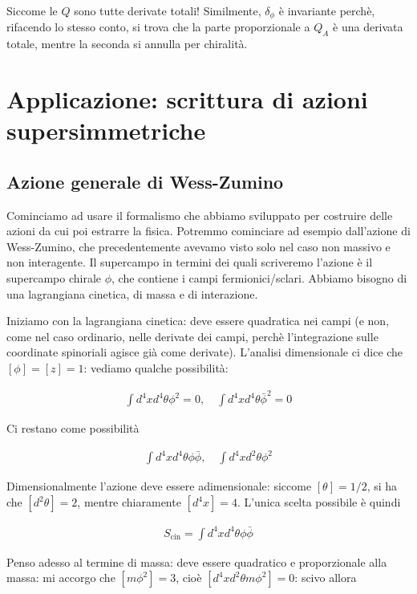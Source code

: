 \documentclass{report}
\begin{document}
Siccome le \(Q\) sono tutte derivate totali! Similmente, \(\delta_\phi\) è invariante perchè, rifacendo lo stesso conto, si trova che la parte proporzionale a \(Q_A\) è una derivata totale, mentre la seconda si annulla per chiralità. 

\section{Applicazione: scrittura di azioni supersimmetriche}

\subsection{Azione generale di Wess-Zumino}

Cominciamo ad usare il formalismo che abbiamo sviluppato per costruire delle azioni da cui poi estrarre la fisica. Potremmo cominciare ad esempio dall'azione di Wess-Zumino, che precedentemente avevamo visto solo nel caso non massivo e non interagente. Il supercampo in termini dei quali scriveremo l'azione è il supercampo chirale \(\phi\), che contiene i campi fermionici/sclari. Abbiamo bisogno di una lagrangiana cinetica, di massa e di interazione. 

Iniziamo con la lagrangiana cinetica: deve essere quadratica nei campi (e non, come nel caso ordinario, nelle derivate dei campi, perchè l'integrazione sulle coordinate spinoriali agisce già come derivate). L'analisi dimensionale ci dice che \([\phi] = [z] = 1\): vediamo qualche possibilità: 

\begin{align}
    \int d^4x d^4 \theta \phi^2 = 0, \quad \int d^4x d^4\theta \bar{\phi}^2 = 0 
\end{align}

Ci restano come possibilità 

\begin{align}
    \int d^4x d^4 \theta \phi \bar{\phi}, \quad \int d^4x d^2\theta \phi^2
\end{align}

Dimensionalmente l'azione deve essere adimensionale: siccome \([\theta] = 1/2\), si ha che \([d^2\theta] =2\), mentre chiaramente \([d^4x] = 4\). L'unica scelta possibile è quindi 

\begin{align}
    S_{\text{cin}} = \int d^4x d^4\theta \phi \bar{\phi}
\end{align}

Penso adesso al termine di massa: deve essere quadratico e proporzionale alla massa: mi accorgo che \([m\phi^2] = 3\), cioè \([d^4x d^2\theta m\phi^2] = 0\): scivo allora 
\end{document}
